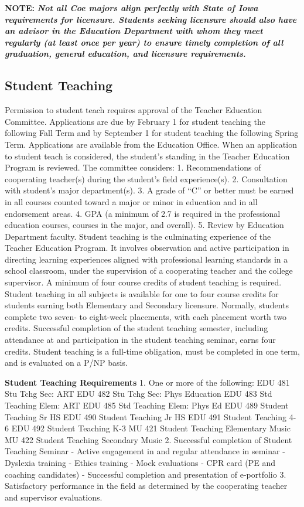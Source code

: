 \documentclass[
  letterpaper,
]{scrbook}
\begin{document}
\textbf{NOTE:} \textbf{\emph{Not all Coe majors align perfectly with
State of Iowa requirements for licensure. Students seeking licensure
should also have an advisor in the Education Department with whom they
meet regularly (at least once per year) to ensure timely completion of
all graduation, general education, and licensure requirements.}}

\hypertarget{student-teaching}{%
\subsection{Student Teaching}\label{student-teaching}}

Permission to student teach requires approval of the Teacher Education
Committee. Applications are due by February 1 for student teaching the
following Fall Term and by September 1 for student teaching the
following Spring Term. Applications are available from the Education
Office. When an application to student teach is considered, the
student's standing in the Teacher Education Program is reviewed. The
committee considers: 1. Recommendations of cooperating teacher(s) during
the student's field experience(s). 2. Consultation with student's major
department(s). 3. A grade of ``C'' or better must be earned in all
courses counted toward a major or minor in education and in all
endorsement areas. 4. GPA (a minimum of 2.7 is required in the
professional education courses, courses in the major, and overall). 5.
Review by Education Department faculty. Student teaching is the
culminating experience of the Teacher Education Program. It involves
observation and active participation in directing learning experiences
aligned with professional learning standards in a school classroom,
under the supervision of a cooperating teacher and the college
supervisor. A minimum of four course credits of student teaching is
required. Student teaching in all subjects is available for one to four
course credits for students earning both Elementary and Secondary
licensure. Normally, students complete two seven- to eight-week
placements, with each placement worth two credits. Successful completion
of the student teaching semester, including attendance at and
participation in the student teaching seminar, earns four credits.
Student teaching is a full-time obligation, must be completed in one
term, and is evaluated on a P/NP basis.

\textbf{Student Teaching Requirements} 1. One or more of the following:
EDU 481 Stu Tchg Sec: ART EDU 482 Stu Tchg Sec: Phys Education EDU 483
Std Teaching Elem: ART EDU 485 Std Teaching Elem: Phys Ed EDU 489
Student Teaching Sr HS EDU 490 Student Teaching Jr HS EDU 491 Student
Teaching 4-6 EDU 492 Student Teaching K-3 MU 421 Student Teaching
Elementary Music MU 422 Student Teaching Secondary Music 2. Successful
completion of Student Teaching Seminar - Active engagement in and
regular attendance in seminar - Dyslexia training - Ethics training -
Mock evaluations - CPR card (PE and coaching candidates) - Successful
completion and presentation of e-portfolio 3. Satisfactory performance
in the field as determined by the cooperating teacher and supervisor
evaluations.
\end{document}
